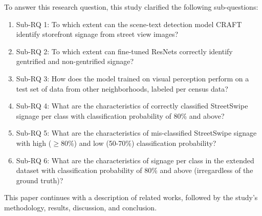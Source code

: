 To answer this research question, this study clarified the following sub-questions: 

\begin{enumerate}
    \item Sub-RQ 1: To which extent can the scene-text detection model CRAFT identify storefront signage from street view images?
    \item Sub-RQ 2: To which extent can fine-tuned ResNets correctly identify gentrified and non-gentrified signage?
    \item Sub-RQ 3: How does the model trained on visual perception perform on a test set of data from other neighborhoods, labeled per census data?
    \item Sub-RQ 4: What are the characteristics of correctly classified StreetSwipe signage per class with classification probability of 80\% and above?
    \item Sub-RQ 5: What are the characteristics of mis-classified StreetSwipe signage with high ($ \geq 80\% $) and low (50-70\%) classification probability?
    \item Sub-RQ 6: What are the characteristics of signage per class in the extended dataset with classification probability of 80\% and above (irregardless of the ground truth)?
\end{enumerate}

This paper continues with a description of related works, followed by the study's methodology, results, discussion, and conclusion.
